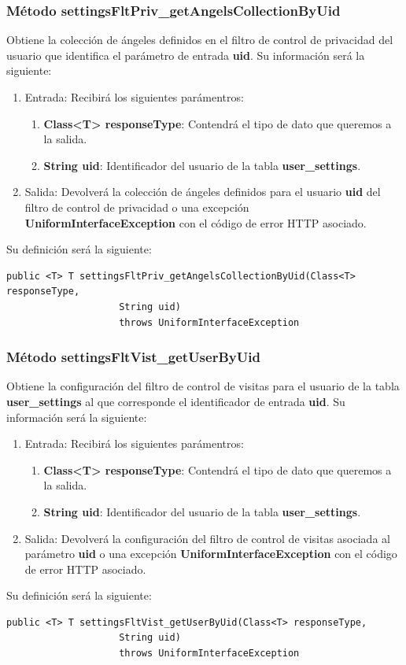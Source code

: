 \subsubsection{Método settingsFltPriv\_getAngelsCollectionByUid}
Obtiene la colección de ángeles definidos en el filtro de control de privacidad del usuario que identifica el parámetro de entrada \textbf{uid}. Su información será la siguiente:
\begin{enumerate}
\item Entrada: Recibirá los siguientes parámentros:
\begin{enumerate}
\item \textbf{Class<T> responseType}: Contendrá el tipo de dato que queremos a la salida. 
\item \textbf{String uid}: Identificador del usuario de la tabla \textbf{user\_settings}.
\end{enumerate}
\item Salida: Devolverá la colección de ángeles definidos para el usuario \textbf{uid} del filtro de control de privacidad o una excepción \textbf{UniformInterfaceException} con el código de error HTTP asociado.
\end{enumerate}
\bigskip
\par
Su definición será la siguiente:
\begin{verbatim}public <T> T settingsFltPriv_getAngelsCollectionByUid(Class<T> responseType, 
					String uid) 
					throws UniformInterfaceException \end{verbatim}







\subsubsection{Método settingsFltVist\_getUserByUid}
Obtiene la configuración del filtro de control de visitas para el usuario de la tabla \textbf{user\_settings} al que corresponde el identificador de entrada \textbf{uid}. Su información será la siguiente:
\begin{enumerate}
\item Entrada: Recibirá los siguientes parámentros:
\begin{enumerate}
\item \textbf{Class<T> responseType}: Contendrá el tipo de dato que queremos a la salida. 
\item \textbf{String uid}: Identificador del usuario de la tabla \textbf{user\_settings}.
\end{enumerate}
\item Salida: Devolverá la configuración del filtro de control de visitas asociada al parámetro \textbf{uid} o una excepción \textbf{UniformInterfaceException} con el código de error HTTP asociado.
\end{enumerate}
\bigskip
\par
Su definición será la siguiente:
\begin{verbatim}public <T> T settingsFltVist_getUserByUid(Class<T> responseType, 
					String uid) 
					throws UniformInterfaceException\end{verbatim}


